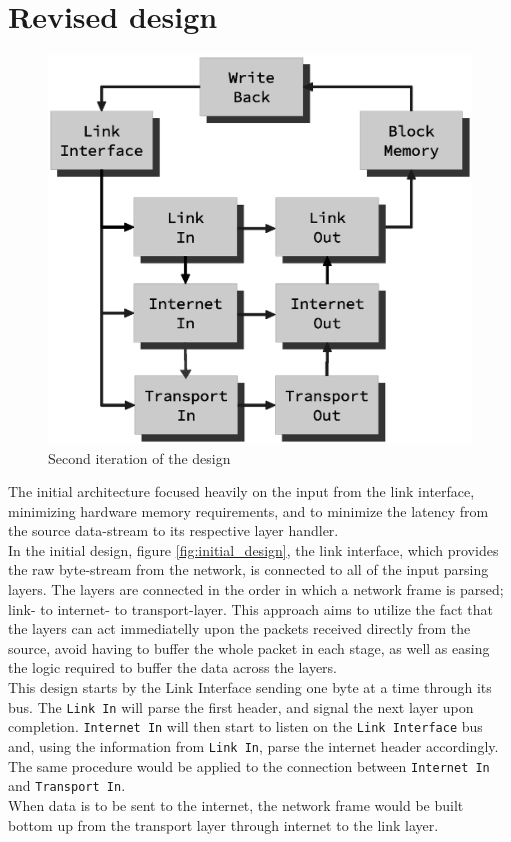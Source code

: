 \section{Revised design}


\begin{figure}
    \centering
    \includegraphics[scale=0.45]{design/design_1.eps}
    \caption{Second iteration of the design}
    \label{fig:second_design}
\end{figure}


The initial architecture focused heavily on the input from the link interface, 
minimizing hardware memory requirements, and to minimize the latency from the 
source data-stream to its respective layer handler.\\
In the initial design, figure \ref{fig:initial_design}, the link interface, which
provides the raw byte-stream from the network, is connected to all of the input
parsing layers. The layers are connected in the order in which a network frame 
is parsed; link- to internet- to transport-layer. This approach aims to utilize
the fact that the layers can act immediatelly upon the packets received directly
from the source, avoid having to buffer the whole packet in each stage, as well 
as easing the logic required to buffer the data across the layers.\\
This design starts by the Link Interface sending one byte at a time through its bus. 
The \texttt{Link In} will parse the first header, and signal the next layer upon completion.
\texttt{Internet In} will then start to listen on the \texttt{Link Interface} bus
and, using the information from \texttt{Link In}, parse the internet header 
accordingly. The same procedure would be applied to the connection between 
\texttt{Internet In} and \texttt{Transport In}.\\
When data is to be sent to the internet, the network frame would be built bottom
up from the transport layer through internet to the link layer.

